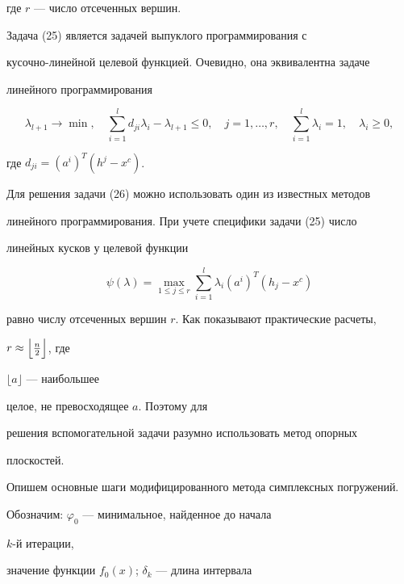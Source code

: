 где $r$ --- число отсеченных вершин.





Задача (25) является задачей выпуклого программирования с


кусочно-линейной целевой функцией. Очевидно, она эквивалентна задаче


линейного программирования


\begin{equation}


\lambda_{l+1}\to\min,\quad


\sum^l_{i=1}d_{ji}\lambda_i-\lambda_{l+1}\le 0,\quad j=1,\dotsc,r,


\quad \sum^l_{i=1}\lambda_i=1,\quad\lambda_i\ge 0,


\end{equation}


где $d_{ji}=(a^i)^T(h^j-x^c)$.





Для решения задачи (26) можно использовать один из известных методов


линейного программирования. При учете специфики задачи (25) число


линейных кусков у целевой функции


$$


\psi(\lambda)=\max_{1\le j\le r}\sum^l_{i=1}


\lambda_i(a^i)^T(h_j-x^c)


$$


равно числу отсеченных вершин $r$. Как показывают практические расчеты,


$r\approx\Bigl\lfloor\frac{n}{2}\Bigr\rfloor$, где


$\lfloor a\rfloor$ --- наибольшее


целое, не превосходящее $a$. Поэтому для


решения вспомогательной задачи разумно использовать метод опорных


плоскостей.





Опишем основные шаги модифицированного метода симплексных погружений.





Обозначим: $\varphi_0$ --- минимальное, найденное до начала


$k$-й итерации,


значение функции $f_0(x)$; $\delta_k$ --- длина интервала


